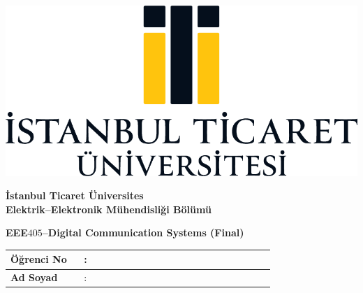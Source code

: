 \documentclass[a4paper, 11pt]{article}
\begin{document}
	\boldmath
	\thispagestyle{empty}
	\begin{minipage}[c]{\textwidth}
		\begin{minipage}[c]{0.3\textwidth}
			\centering
			\includegraphics[width=\textwidth]{logo.png}
		\end{minipage}%
		\begin{minipage}[c]{0.7\textwidth}
			\centering
			{\LARGE \textbf{İstanbul Ticaret Üniversites}}\\[1em]
			{\Large \textbf{Elektrik--Elektronik Mühendisliği Bölümü}}
		\end{minipage}
	\end{minipage}
	
	\begin{center}
		\Large
		\textbf{EEE$405$--Digital Communication Systems (Final)}
	\end{center}
	
	\begin{table}[!ht]
		\renewcommand{\arraystretch}{2}
		\centering
		\begin{tabular}{@{}|L{0.25\linewidth} C{0.05\linewidth} p{0.60\linewidth}|@{}}
			\hline
			\textbf{Öğrenci No}& : & ~ \\ \hline
			\textbf{Ad Soyad}  & : & ~ \\ \hline
		\end{tabular}
	\end{table}
	
\end{document}
